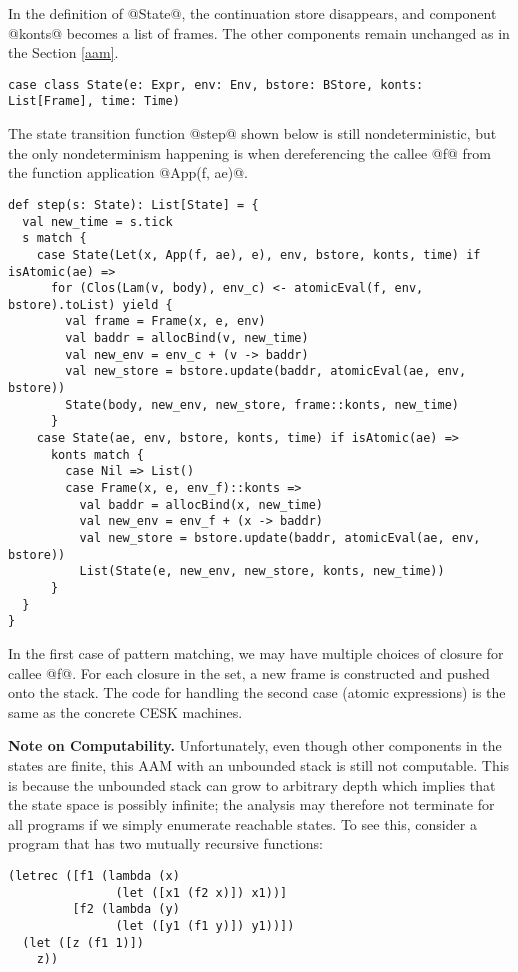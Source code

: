 \documentclass[acmsmall]{acmart}\settopmatter{}
\begin{document}
In the definition of @State@, the continuation store disappears, and
component @konts@ becomes a list of frames. 
The other components remain unchanged as in the Section \ref{aam}.

\begin{lstlisting}
case class State(e: Expr, env: Env, bstore: BStore, konts: List[Frame], time: Time)
\end{lstlisting}

The state transition function @step@ shown below is still
nondeterministic, but the only nondeterminism happening is when dereferencing the callee @f@
from the function application @App(f, ae)@.

\begin{lstlisting}
def step(s: State): List[State] = {
  val new_time = s.tick
  s match {
    case State(Let(x, App(f, ae), e), env, bstore, konts, time) if isAtomic(ae) =>
      for (Clos(Lam(v, body), env_c) <- atomicEval(f, env, bstore).toList) yield {
        val frame = Frame(x, e, env)
        val baddr = allocBind(v, new_time)
        val new_env = env_c + (v -> baddr)
        val new_store = bstore.update(baddr, atomicEval(ae, env, bstore))
        State(body, new_env, new_store, frame::konts, new_time)
      }
    case State(ae, env, bstore, konts, time) if isAtomic(ae) =>
      konts match {
        case Nil => List()
        case Frame(x, e, env_f)::konts =>
          val baddr = allocBind(x, new_time)
          val new_env = env_f + (x -> baddr)
          val new_store = bstore.update(baddr, atomicEval(ae, env, bstore))
          List(State(e, new_env, new_store, konts, new_time))
      }
  }
}
\end{lstlisting}

In the first case of pattern matching, we may have multiple choices of closure for callee @f@.
For each closure in the set, a new frame is constructed and pushed onto the stack.
The code for handling the second case (atomic expressions) is the same as the concrete CESK
machines.

\textbf{Note on Computability.}
Unfortunately, even though other components in the states are finite,
this AAM with an unbounded stack is still not computable.
This is because the unbounded stack can grow to arbitrary depth which implies that the state
space is possibly infinite; the analysis may therefore not terminate for all programs if we
simply enumerate reachable states. To see this, consider a program that has two mutually
recursive functions:

\begin{lstlisting}
(letrec ([f1 (lambda (x)
               (let ([x1 (f2 x)]) x1))]
         [f2 (lambda (y)
               (let ([y1 (f1 y)]) y1))])
  (let ([z (f1 1)])
    z))
\end{lstlisting}
\end{document}
